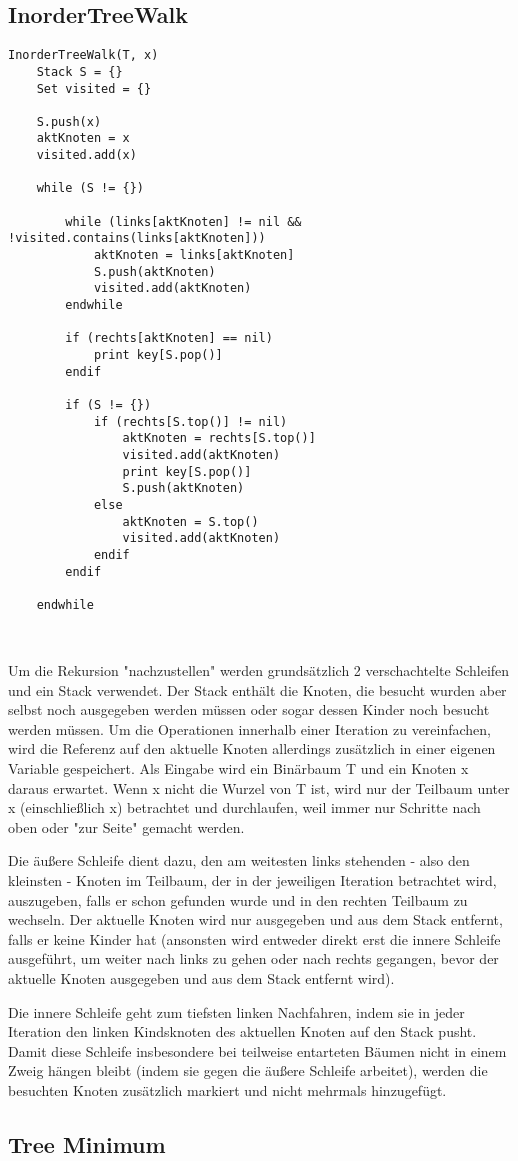 \subsection{InorderTreeWalk}

\begin{lstlisting}
InorderTreeWalk(T, x)
	Stack S = {}
	Set visited = {}
	
	S.push(x)
	aktKnoten = x
	visited.add(x)
	
	while (S != {})
	
		while (links[aktKnoten] != nil && !visited.contains(links[aktKnoten]))
			aktKnoten = links[aktKnoten]
			S.push(aktKnoten)
			visited.add(aktKnoten)
		endwhile

		if (rechts[aktKnoten] == nil)
			print key[S.pop()]
		endif
			
		if (S != {})
			if (rechts[S.top()] != nil)
				aktKnoten = rechts[S.top()]
				visited.add(aktKnoten)
				print key[S.pop()]
				S.push(aktKnoten)
			else
				aktKnoten = S.top()
				visited.add(aktKnoten)
			endif
		endif
		
	endwhile
\end{lstlisting}

\begin{tabbing}
\\
\end{tabbing}

Um die Rekursion "nachzustellen" werden grundsätzlich 2 verschachtelte Schleifen und ein Stack verwendet. Der Stack enthält die Knoten, die besucht wurden aber selbst noch ausgegeben werden müssen oder sogar dessen Kinder noch besucht werden müssen. Um die Operationen innerhalb einer Iteration zu vereinfachen, wird die Referenz auf den aktuelle Knoten allerdings zusätzlich in einer eigenen Variable gespeichert. Als Eingabe wird ein Binärbaum T und ein Knoten x daraus erwartet. Wenn x nicht die Wurzel von T ist, wird nur der Teilbaum unter x (einschließlich x) betrachtet und durchlaufen, weil immer nur Schritte nach oben oder "zur Seite" gemacht werden.

Die äußere Schleife dient dazu, den am weitesten links stehenden - also den kleinsten - Knoten im Teilbaum, der in der jeweiligen Iteration betrachtet wird, auszugeben, falls er schon gefunden wurde und in den rechten Teilbaum zu wechseln. 
Der aktuelle Knoten wird nur ausgegeben und aus dem Stack entfernt, falls er keine Kinder hat (ansonsten wird entweder direkt erst die innere Schleife ausgeführt, um weiter nach links zu gehen oder nach rechts gegangen, bevor der aktuelle Knoten ausgegeben und aus dem Stack entfernt wird).

Die innere Schleife geht zum tiefsten linken Nachfahren, indem sie in jeder Iteration den linken Kindsknoten des aktuellen Knoten auf den Stack pusht. 
Damit diese Schleife insbesondere bei teilweise entarteten Bäumen nicht in einem Zweig hängen bleibt (indem sie gegen die äußere Schleife arbeitet), werden die besuchten Knoten zusätzlich markiert und nicht mehrmals hinzugefügt.



\subsection{Tree Minimum}